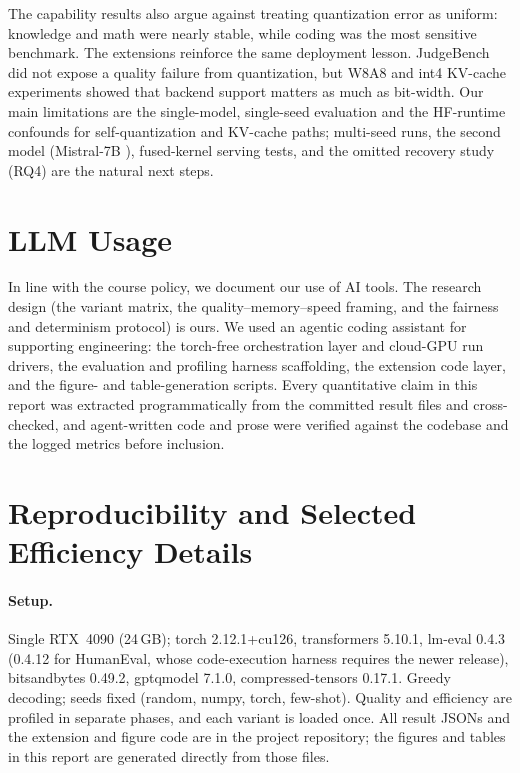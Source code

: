 \documentclass[11pt,a4paper]{article}
\begin{document}
The capability results also argue against treating quantization error as uniform:
knowledge and math were nearly stable, while coding was the most sensitive
benchmark. The extensions reinforce the same deployment lesson. JudgeBench did not
expose a quality failure from quantization, but W8A8 and int4 KV-cache experiments
showed that backend support matters as much as bit-width. Our main limitations are
the single-model, single-seed evaluation and the HF-runtime confounds for
self-quantization and KV-cache paths; multi-seed runs, the second model
(Mistral-7B \citep{mistral7b}), fused-kernel serving tests, and the omitted
recovery study (RQ4) are the natural next steps.

\section*{LLM Usage}
In line with the course policy, we document our use of AI tools. The research
design (the variant matrix, the quality--memory--speed framing, and the fairness
and determinism protocol) is ours. We used an agentic coding assistant for
supporting engineering: the torch-free orchestration layer and cloud-GPU run drivers,
the evaluation and profiling harness scaffolding, the extension code layer, and the
figure- and table-generation scripts. Every quantitative claim in this report was
extracted programmatically from the committed result files and cross-checked, and
agent-written code and prose were verified against the codebase and the logged
metrics before inclusion.




\newpage
\appendix
\section{Reproducibility and Selected Efficiency Details}

\paragraph{Setup.} Single RTX~4090 (24\,GB); torch
2.12.1+cu126, transformers 5.10.1, lm-eval 0.4.3 (0.4.12 for HumanEval, whose
code-execution harness requires the newer release), bitsandbytes 0.49.2,
gptqmodel 7.1.0, compressed-tensors 0.17.1. Greedy decoding; seeds fixed
(random, numpy, torch, few-shot). Quality and efficiency are profiled in separate
phases, and each variant is loaded once. All result JSONs and the extension and
figure code are in the project repository; the figures and tables in this report
are generated directly from those files.
\end{document}
